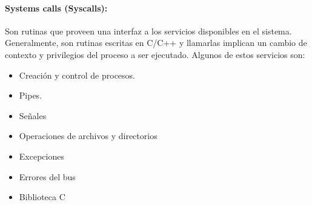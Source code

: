\paragraph{Systems calls (Syscalls):} Son rutinas que proveen una interfaz a los servicios disponibles en el sistema. Generalmente, son rutinas escritas en C/C++ y llamarlas implican un cambio de contexto y privilegios del proceso a ser ejecutado. Algunos de estos servicios son:
\begin{itemize}
	\item Creación y control de procesos.
	\item Pipes.
	\item Señales
	\item Operaciones de archivos y directorios
	\item Excepciones
	\item Errores del bus
	\item Biblioteca C
\end{itemize}

\printbibliography[keyword=intro, title=Bibliografía]
